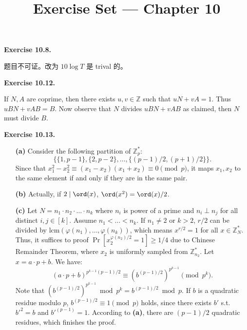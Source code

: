 \documentclass[a4paper]{article}
\title{Exercise Set --- Chapter 10}
\date{}
\newenvironment{exercise}[1]{
	\par
	\noindent\textbf{Exercise #1.}\quad
}{
	\par
	\bigskip
}
\begin{document}
    \maketitle

    \begin{exercise}{10.8}
		题目不可证。改为 $10\log T$ 是 trival 的。		
	\end{exercise}

	\begin{exercise}{10.12}
        If $N,A$ are coprime, then there exists $u,v\in\mathbb Z$ such that $uN+vA=1$.
        Thus $uBN+vAB=B$. Now observe that $N$ divides $uBN+vAB$ as claimed, then $N$ must divide $B$.
	\end{exercise}

	\begin{exercise}{10.13}
		\begin{itemize}
			\item [\textbf{(a)}] Consider the following partition of $\mathbb Z_p^*$:
			\[
				\{\{1, p - 1\}, \{2, p - 2\}, \ldots, \{(p - 1)/2, (p + 1)/2\}\}.
			\]
			Since that $x_1^2 - x_2^2 \equiv (x_1 - x_2)(x_1 + x_2) \equiv 0 \pmod p$, it maps $x_1, x_2$ to the same element if and only if they are in the same pair.

			\item [\textbf{(b)}] Actually, if $2 \mid \ord(x)$, $\ord(x^2) = \ord(x)/2$.

			\item [\textbf{(c)}] Let $N = n_1\cdot n_2 \cdot \ldots \cdot n_k$ where $n_i$ is power of a prime and $n_i \perp n_j$ for all distinct $i, j \in [k]$. Assume $n_1 < \ldots < n_k$. If $n_1 \neq 2$ or $k > 2$, $r / 2$ can be divided by $\text{lcm}(\varphi(n_1), \ldots, \varphi(n_k))$, which means $x^{r/2} = 1$ for all $x \in \mathbb Z_{N}^*$. Thus, it suffices to proof $\Pr[x_2^{\varphi(n_2)/2} = 1] \geq 1/4$ due to Chinese Remainder Theorem, where $x_2$ is uniformly sampled from $\mathbb Z_{n_2}^*$. Let $x = a\cdot p + b$. We have:
			\[
				(a\cdot p + b)^{p^{k - 1}(p - 1)/2} \equiv (b^{(p - 1)/2})^{p^{k - 1}} \pmod {p^k}.
			\]
			Note that $(b^{(p - 1)/2})^{p^{k - 1}} \bmod {p^k} = b^{(p - 1)/2} \bmod p$. If $b$ is a quadratic residue modulo $p$, $b^{(p - 1)/2} \equiv 1 \pmod p$ holds, since there exists $b'$ s.t. $b'^2 = b$ and $b'^{(p - 1)} = 1$. According to \textbf{(a)}, there are $(p - 1)/2$ quadratic residues, which finishes the proof.

		\end{itemize}
	\end{exercise}
\end{document}
